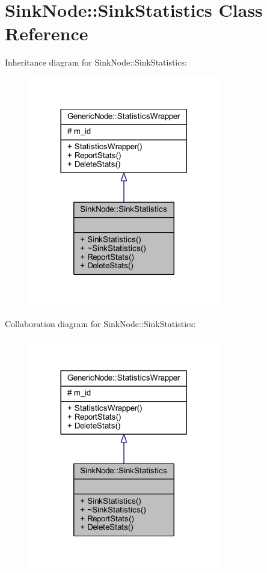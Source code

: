 \hypertarget{class_sink_node_1_1_sink_statistics}{}\section{Sink\+Node\+:\+:Sink\+Statistics Class Reference}
\label{class_sink_node_1_1_sink_statistics}


Inheritance diagram for Sink\+Node\+:\+:Sink\+Statistics\+:\nopagebreak
\begin{figure}[H]
\begin{center}
\leavevmode
\includegraphics[width=237pt]{class_sink_node_1_1_sink_statistics__inherit__graph}
\end{center}
\end{figure}


Collaboration diagram for Sink\+Node\+:\+:Sink\+Statistics\+:\nopagebreak
\begin{figure}[H]
\begin{center}
\leavevmode
\includegraphics[width=237pt]{class_sink_node_1_1_sink_statistics__coll__graph}
\end{center}
\end{figure}
